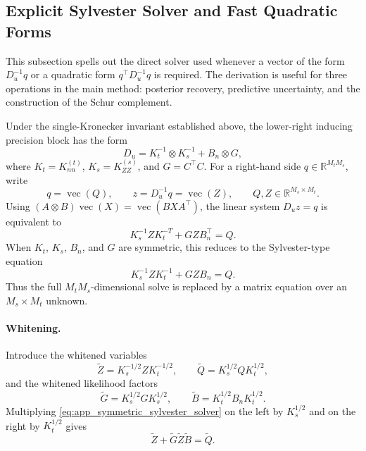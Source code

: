 \documentclass[12pt]{article}
\newcommand{\vecop}{\operatorname{vec}}
\begin{document}
\subsection{Explicit Sylvester Solver and Fast Quadratic Forms}
\label{app:explicit_sylvester_solver}

This subsection spells out the direct solver used whenever a vector of the form
\(D_u^{-1}q\) or a quadratic form \(q^\top D_u^{-1}q\) is required.  The derivation
is useful for three operations in the main method: posterior recovery,
predictive uncertainty, and the construction of the Schur complement.

Under the single-Kronecker invariant established above, the lower-right
inducing precision block has the form
\begin{equation}
    D_u
    =
    K_t^{-1}\otimes K_s^{-1}+B_n\otimes G,
    \label{eq:app_explicit_du}
\end{equation}
where \(K_t=K_{nn}^{(t)}\), \(K_s=K_{ZZ}^{(s)}\), and \(G=C^\top C\).
For a right-hand side \(q\in\mathbb{R}^{M_tM_s}\), write
\begin{equation}
    q=\vecop(Q),
    \qquad
    z=D_u^{-1}q=\vecop(Z),
    \qquad
    Q,Z\in\mathbb{R}^{M_s\times M_t}.
    \label{eq:app_qz_matrix_form}
\end{equation}
Using \((A\otimes B)\vecop(X)=\vecop(BXA^\top)\), the linear system
\(D_uz=q\) is equivalent to
\begin{equation}
    K_s^{-1}ZK_t^{-T}+GZB_n^\top=Q.
    \label{eq:app_general_sylvester_solver}
\end{equation}
When \(K_t\), \(K_s\), \(B_n\), and \(G\) are symmetric, this reduces to the
Sylvester-type equation
\begin{equation}
    K_s^{-1}ZK_t^{-1}+GZB_n=Q.
    \label{eq:app_symmetric_sylvester_solver}
\end{equation}
Thus the full \(M_tM_s\)-dimensional solve is replaced by a matrix equation over
an \(M_s\times M_t\) unknown.

\paragraph{Whitening.}
Introduce the whitened variables
\begin{equation}
    \widetilde Z=K_s^{-1/2}ZK_t^{-1/2},
    \qquad
    \widetilde Q=K_s^{1/2}QK_t^{1/2},
    \label{eq:app_whitened_ZQ}
\end{equation}
and the whitened likelihood factors
\begin{equation}
    \widetilde G=K_s^{1/2}GK_s^{1/2},
    \qquad
    \widetilde B=K_t^{1/2}B_nK_t^{1/2}.
    \label{eq:app_whitened_GB}
\end{equation}
Multiplying \eqref{eq:app_symmetric_sylvester_solver} on the left by
\(K_s^{1/2}\) and on the right by \(K_t^{1/2}\) gives
\begin{equation}
    \widetilde Z+\widetilde G\widetilde Z\widetilde B=\widetilde Q.
    \label{eq:app_whitened_sylvester_solver}
\end{equation}
\end{document}
